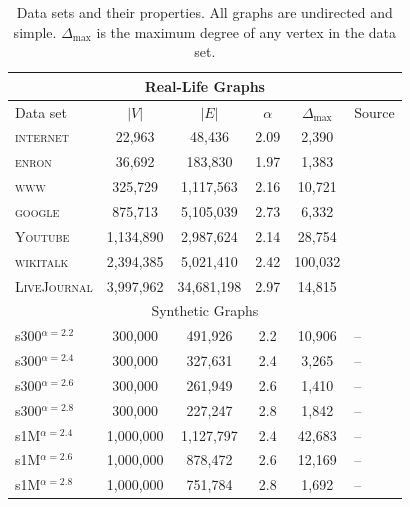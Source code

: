 \begin{table}[!ht]
\centering
\small
\begin{tabular}{lccccl}\hline
\multicolumn{6}{c}{Real-Life Graphs}\\\hline
Data set  & $\vert V \vert$ & $\vert E\vert$ & $\alpha$  & $\Delta_{\max}$ & Source\\\hline
\textsc{internet} &  22,963        &    48,436      & 2.09     & 2,390        & \cite{newman}\\
\textsc{enron}    &  36,692        &   183,830      & 1.97    &1,383         & \cite{leskovec2009community}\\
\textsc{www}      & 325,729        & 1,117,563     & 2.16 & 10,721            & \cite{albert1999internet}\\
\textsc{google} & 875,713 & 5,105,039 & 2.73 & 6,332 & \cite{leskovec2009community}\\
\textsc{Youtube} & 1,134,890 & 2,987,624 & 2.14 & 28,754 & \cite{yang2015defining}\\
\textsc{wikitalk} & 2,394,385 & 5,021,410 & 2.42 & 100,032 & \cite{leskovec2010predicting}\\
\textsc{LiveJournal} &  3,997,962        &    34,681,198      & 2.97     & 14,815        & \cite{yang2015defining}\\\hline


\multicolumn{6}{c}{Synthetic Graphs}\\\hline
s300$^{\alpha=2.2}$    & 300,000        & 491,926        & 2.2    & 10,906 & --\\
s300$^{\alpha=2.4}$    & 300,000        & 327,631        & 2.4    & 3,265 & --\\
s300$^{\alpha=2.6}$    & 300,000        & 261,949        & 2.6    & 1,410 & --\\
s300$^{\alpha=2.8}$    & 300,000        & 227,247        & 2.8    & 1,842 & --\\
s1M$^{\alpha=2.4}$    & 1,000,000       & 1,127,797      & 2.4    & 42,683 &-- \\
s1M$^{\alpha=2.6}$    & 1,000,000       & 878,472        & 2.6    & 12,169 &-- \\
s1M$^{\alpha=2.8}$    & 1,000,000       & 751,784         & 2.8   & 1,692  &-- \\\hline
\end{tabular}
\caption{Data sets and their properties. All graphs are undirected and simple. $\Delta_{\max}$ is the maximum degree of any vertex in the data set.}
\label{t:data sets}
\end{table}


